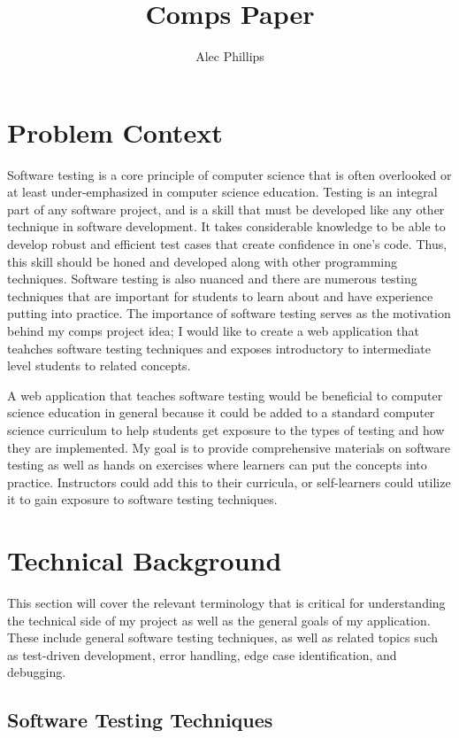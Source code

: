 \documentclass[10pt,twocolumn]{article}
\title{Comps Paper}
\author{Alec Phillips}
\affiliation{Occidental College}
\begin{document}
\maketitle

\section{Problem Context}

Software testing is a core principle of computer science that is often overlooked or at least under-emphasized in 
computer science education. Testing is an integral part of any software project, and is a skill that must be developed 
like any other technique in software development. It takes considerable knowledge to be able to develop robust and 
efficient test cases that create confidence in one's code. Thus, this skill should be honed and developed along with 
other programming techniques. Software testing is also nuanced and there are numerous testing techniques that are 
important for students to learn about and have experience putting into practice. The importance of software testing 
serves as the motivation behind my comps project idea; I would like to create a web application that teahches software 
testing techniques and exposes introductory to intermediate level students to related concepts. 

A web application that teaches software testing would be beneficial to computer science education in general because 
it could be added to a standard computer science curriculum to help students get exposure to the types of testing and how 
they are implemented. My goal is to 
provide comprehensive materials on software testing as well as hands on exercises where learners can put the concepts 
into practice. Instructors could add this to their curricula, or self-learners could utilize it to gain exposure to 
software testing techniques. 

\section{Technical Background}

This section will cover the relevant terminology that is critical for understanding the technical side of my project as
well as the general goals of my application. These include general software testing techniques, as well as related topics
such as test-driven development, error handling, edge case identification, and debugging.

\subsection{Software Testing Techniques}
\end{document}
